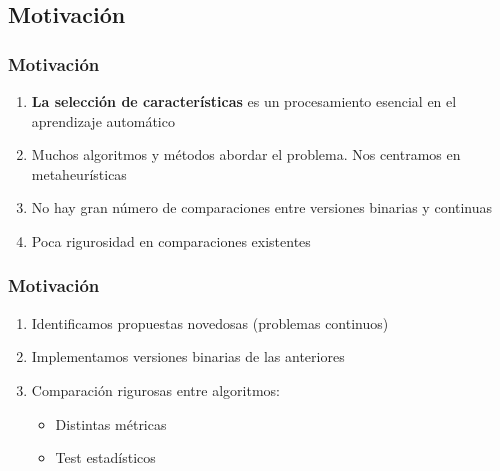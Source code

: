\note{

}

\subsection{Motivación}
\begin{frame}
  \frametitle{Motivación}
  \begin{enumerate}
    \item \textbf{La selección de características} es un procesamiento esencial en el aprendizaje automático
    \item Muchos algoritmos y métodos abordar el problema. Nos centramos en
          metaheurísticas
    \item No hay gran número de comparaciones entre versiones binarias y continuas
    \item Poca rigurosidad en comparaciones existentes
  \end{enumerate}
  \vspace{-.2cm}
\end{frame}

\begin{frame}
  \frametitle{Motivación}
  \begin{enumerate}
    \item Identificamos propuestas novedosas (problemas continuos)
    \item Implementamos versiones binarias de las anteriores
    \item Comparación rigurosas entre algoritmos:
          \begin{itemize}
            \item Distintas métricas
            \item Test estadísticos
          \end{itemize}
  \end{enumerate}
  \vspace{-.2cm}
\end{frame}

